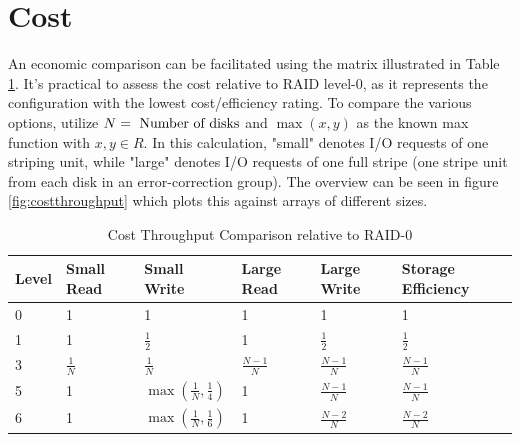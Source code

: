\documentclass{article}
\begin{document}
\section{Cost}
An economic comparison can be facilitated using the matrix illustrated in Table \ref{tab:economics}.
It's practical to assess the cost relative to RAID level-0, as it represents the configuration with the 
lowest cost/efficiency rating. To compare the various options, utilize \( N = \textnormal{ Number of disks}\)
and \(\max\left(x,y\right)\) as the known max function with \( x, y \in R \).
In this calculation, "small" denotes I/O requests of one striping unit, while "large" 
denotes I/O requests of one full stripe (one stripe unit from each disk in an error-correction group). 
The overview can be seen in figure \ref{fig:costthroughput} which 
plots this against arrays of different sizes. \cite{cmu:raidhighperf}
\begin{table}[h]
    \begin{tabularx}{\textwidth}{l|X|X|X|X|X}
        \textbf{Level} &
        Small Read &
        Small Write &
        Large Read &
        Large Write &
        Storage Efficiency \\
        \hline
        0 & 1 & 1 & 1 & 1 & 1 \\
        1 & 1 & \( \frac{1}{2} \) & 1 & \( \frac{1}{2} \) & \( \frac{1}{2} \) \\
        3 & \( \frac{1}{N} \) & \( \frac{1}{N} \) & \( \frac{N-1}{N} \) & \( \frac{N-1}{N} \) & \( \frac{N-1}{N} \) \\
        5 & 1 & \( \max\left(\frac{1}{N},\frac{1}{4}\right) \) & 1 & \( \frac{N-1}{N} \) & \( \frac{N-1}{N} \) \\
        6 & 1 & \( \max\left(\frac{1}{N},\frac{1}{6}\right) \) & 1 & \( \frac{N-2}{N} \) & \( \frac{N-2}{N} \) \\
    \end{tabularx}
    \caption{Cost Throughput Comparison relative to RAID-0 \cite{cmu:raidhighperf}}
    \label{tab:economics}
\end{table}
\pagebreak
\end{document}
